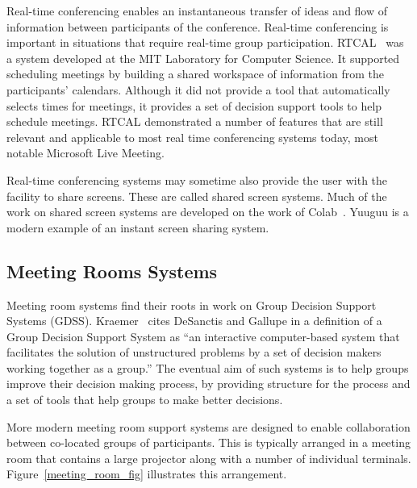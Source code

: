 Real-time conferencing enables an instantaneous transfer of ideas and
flow of information between participants of the conference. Real-time
conferencing is important in situations that require real-time group
participation.  RTCAL~\cite{SG85} was a system developed at the MIT
Laboratory for Computer Science.  It supported scheduling meetings by
building a shared workspace of information from the participants'
calendars.  Although it did not provide a tool that automatically
selects times for meetings, it provides a set of decision support
tools to help schedule meetings.  RTCAL demonstrated a number of
features that are still relevant and applicable to most real time
conferencing systems today, most notable Microsoft Live Meeting.

Real-time conferencing systems may sometime also provide the user with
the facility to share screens. These are called shared screen
systems. Much of the work on shared screen systems are developed on
the work of Colab~\cite{Stefik:1987:BCU}. Yuuguu is a modern example
of an instant screen sharing system.

\subsection{Meeting Rooms Systems}


Meeting room systems find their roots in work on Group Decision
Support Systems (GDSS). Kraemer~\cite{KraKin88} cites DeSanctis and
Gallupe\cite{DG85} in a definition of a Group Decision Support System
as ``an interactive computer-based system that facilitates the
solution of unstructured problems by a set of decision makers working
together as a group.'' The eventual aim of such systems is to help
groups improve their decision making process, by providing structure
for the process and a set of tools that help groups to make better
decisions.

More modern meeting room support systems are designed to enable
collaboration between co-located groups of participants.  This is
typically arranged in a meeting room that contains a large projector
along with a number of individual terminals.
Figure~\ref{meeting_room_fig} illustrates this arrangement.


